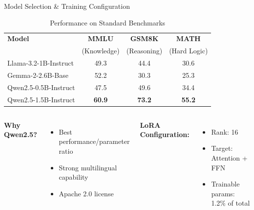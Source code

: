 \documentclass[aspectratio=169]{beamer}
\begin{document}
\begin{frame}{Model Selection \& Training Configuration}
\begin{table}
\centering
\caption{Performance on Standard Benchmarks}
\scriptsize
\begin{tabular}{lccc}
\toprule
\textbf{Model} & \textbf{MMLU} & \textbf{GSM8K} & \textbf{MATH} \\
 & (Knowledge) & (Reasoning) & (Hard Logic) \\
\midrule
Llama-3.2-1B-Instruct & 49.3 & 44.4 & 30.6 \\
Gemma-2-2.6B-Base & 52.2 & 30.3 & 25.3 \\
Qwen2.5-0.5B-Instruct & 47.5 & 49.6 & 34.4 \\
\rowcolor{green!20}
Qwen2.5-1.5B-Instruct & \textbf{60.9} & \textbf{73.2} & \textbf{55.2} \\
\bottomrule
\end{tabular}
\end{table}

\vspace{0.3cm}
\begin{columns}[T]
\textbf{Why Qwen2.5?}
\begin{itemize}
    \item Best performance/parameter ratio
    \item Strong multilingual capability
    \item Apache 2.0 license
\end{itemize}

\textbf{LoRA Configuration:}
\begin{itemize}
    \item Rank: 16
    \item Target: Attention + FFN
    \item Trainable params: 1.2\% of total
\end{itemize}
\end{columns}
\end{frame}
\end{document}
